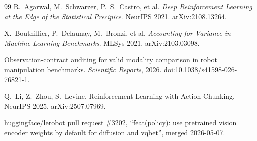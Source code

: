 \documentclass[11pt]{article}
\begin{document}
\begin{thebibliography}{99}
R.~Agarwal, M.~Schwarzer, P.~S.~Castro, et al.
\emph{Deep Reinforcement Learning at the Edge of the Statistical Precipice}.
NeurIPS 2021. arXiv:2108.13264.

X.~Bouthillier, P.~Delaunay, M.~Bronzi, et al.
\emph{Accounting for Variance in Machine Learning Benchmarks}. MLSys 2021.
arXiv:2103.03098.


Observation-contract auditing for valid modality comparison in robot manipulation
benchmarks. \emph{Scientific Reports}, 2026. doi:10.1038/s41598-026-76821-1.

Q.~Li, Z.~Zhou, S.~Levine.
Reinforcement Learning with Action Chunking. NeurIPS 2025. arXiv:2507.07969.

huggingface/lerobot pull request \#3202, ``feat(policy): use pretrained vision
encoder weights by default for diffusion and vqbet'', merged 2026-05-07.

\end{thebibliography}
\end{document}
